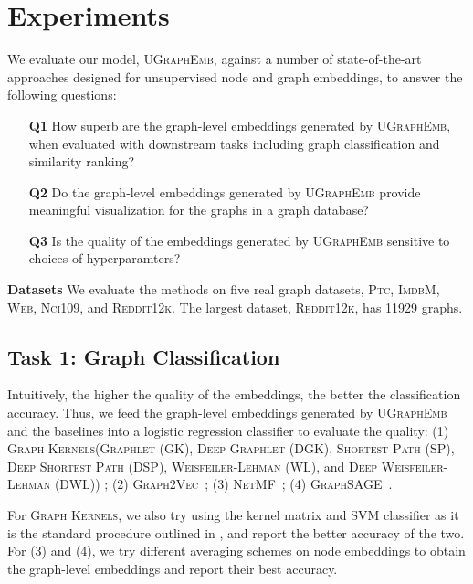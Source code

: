 \documentclass{article}
\newcommand{\model}{\textsc{UGraphEmb}\xspace}
\newcommand{\netmf}{\textsc{NetMF}\xspace}
\newcommand{\graphsage}{\textsc{GraphSAGE}\xspace}
\newcommand{\gk}{\textsc{Graph Kernels}\xspace}
\newcommand{\gv}{\textsc{Graph2Vec}\xspace}
\newcommand{\ptc}{\textsc{Ptc}\xspace}
\newcommand{\imdb}{\textsc{ImdbM}\xspace}
\newcommand{\web}{\textsc{Web}\xspace}
\newcommand{\nci}{\textsc{Nci109}\xspace}
\newcommand{\reddit}{\textsc{Reddit12k}\xspace}
\begin{document}
 \section{Experiments} 
\label{sec-exp}


We evaluate our model, \model, against a number of state-of-the-art approaches designed for unsupervised node and graph embeddings, to answer the following questions:
\begin{enumerate}
\item[{\bf Q1}] How superb are the graph-level embeddings generated by \model, when evaluated with downstream tasks including graph classification and similarity ranking?
\item[{\bf Q2}] Do the graph-level embeddings generated by \model provide meaningful visualization for the graphs in a graph database? 
\item[{\bf Q3}] Is the quality of the embeddings generated by \model sensitive to choices of hyperparamters?
\end{enumerate}



\textbf{Datasets} \enspace We evaluate the methods on five real graph datasets, \ptc, \imdb, \web, \nci, and \reddit.
The largest dataset, \reddit, has 11929 graphs.

\subsection{Task 1: Graph Classification}



Intuitively, the higher the quality of the embeddings, the better the classification accuracy. Thus, we feed the graph-level embeddings generated by \model and the baselines into a logistic regression classifier to evaluate the quality: (1) \gk (\textsc{Graphlet} (\textsc{GK}), \textsc{Deep Graphlet} (\textsc{DGK}), \textsc{Shortest Path} (\textsc{SP}), \textsc{Deep Shortest Path} (\textsc{DSP}), \textsc{Weisfeiler-Lehman} (\textsc{WL}), and \textsc{Deep Weisfeiler-Lehman} (\textsc{DWL}))
; (2) \gv~\cite{narayanan2017graph2vec}; (3) \netmf~\cite{qiu2017network}; (4) \graphsage~\cite{hamilton2017inductive}. 

For \gk, we also try using the kernel matrix and SVM classifier as it is the standard procedure outlined in \cite{yanardag2015deep}, and report the better accuracy of the two. For (3) and (4), we try different averaging schemes on node embeddings to obtain the graph-level embeddings and report their best accuracy.
\end{document}
